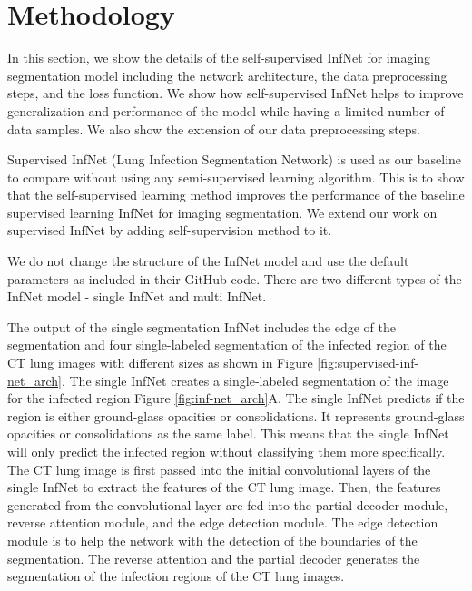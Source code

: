 \section{Methodology}


In this section, we show the details of the self-supervised InfNet for imaging segmentation model including the network architecture, the data preprocessing steps, and the loss function. We show how self-supervised InfNet helps to improve generalization and performance of the model while having a limited number of data samples. We also show the extension of our data preprocessing steps.

Supervised InfNet (Lung Infection Segmentation Network) is used as our baseline to compare without using any semi-supervised learning algorithm. This is to show that the self-supervised learning method improves the performance of the baseline supervised learning InfNet for imaging segmentation. We extend our work on supervised InfNet by adding self-supervision method to it.

We do not change the structure of the InfNet model and use the default parameters as included in their GitHub code. There are two different types of the InfNet model - single InfNet and multi InfNet. 

The output of the single segmentation InfNet includes the edge of the segmentation and four single-labeled segmentation of the infected region of the CT lung images with different sizes as shown in Figure	 \ref{fig:supervised-inf-net_arch}.
The single InfNet creates a single-labeled segmentation of the image for the infected region Figure \ref{fig:inf-net_arch}A. The single InfNet predicts if the region is either ground-glass opacities or consolidations. It represents ground-glass opacities or consolidations as the same label. This means that the single InfNet will only predict the infected region without classifying them more specifically.  The CT lung image is first passed into the initial convolutional layers of the single InfNet to extract the features of the CT lung image. Then, the features generated from the convolutional layer are fed into the partial decoder module, reverse attention module, and the edge detection module. The edge detection module is to help the network with the detection of the boundaries of the segmentation. The reverse attention and the partial decoder generates the segmentation of the infection regions of the CT lung images. 

